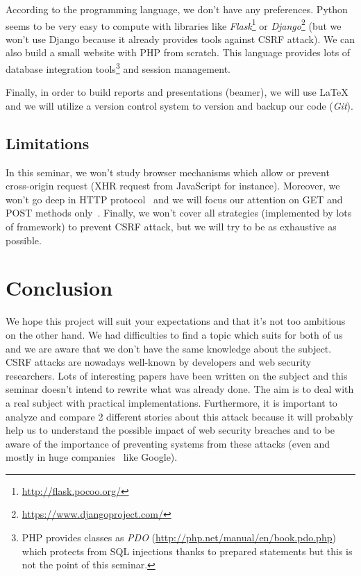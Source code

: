 \documentclass[a4paper,11pt]{article}
\begin{document}
  According to the programming language, we don't have any preferences. Python seems to be very easy to 
  compute with libraries like \textit{Flask}\footnote{\url{http://flask.pocoo.org/}} or 
  \textit{Django}\footnote{\url{https://www.djangoproject.com/}} (but we won't use Django because it 
  already provides tools against CSRF attack). We can also build a small website with PHP from 
  scratch. This language provides lots of database integration tools\footnote{PHP provides classes as \textit{PDO} (\url{http://php.net/manual/en/book.pdo.php}) 
  which protects from SQL injections thanks to prepared statements but this is not the point of this seminar.} 
  and session management.
  
  Finally, in order to build reports and presentations (beamer), we will use \LaTeX{} and we will utilize a version control system to 
  version and backup our code (\textit{Git}).
  
  \subsection{Limitations}

  In this seminar, we won't study browser mechanisms which allow or prevent cross-origin 
  request (XHR request from JavaScript for instance). Moreover, we won't go deep in HTTP 
  protocol~\cite{rfc2616} and we will focus our attention on GET and POST methods 
  only~\cite[5.1.1]{rfc2616}. Finally, we won't cover all strategies (implemented by lots 
  of framework) to prevent CSRF attack, but we will try to be as exhaustive as possible.
  
  \section{Conclusion}
  
  We hope this project will suit your expectations and that it's not too ambitious on the 
  other hand. We had difficulties to find a topic which suits for both of us and we are 
  aware that we don't have the same knowledge about the subject. CSRF attacks are nowadays 
  well-known by developers and web security researchers. Lots of interesting papers have 
  been written on the subject and this seminar doesn't intend to rewrite what was already 
  done. The aim is to deal with a real subject with practical implementations. Furthermore, 
  it is important to analyze and compare 2 different stories about this attack because it 
  will probably help us to understand the possible impact of web security breaches and to be aware  
  of the importance of preventing systems from these attacks (even and mostly in huge companies~\cite{popular_csrf_attacks} 
  like Google).
  
  
  \nocite{wikipedia}
  \nocite{owasp_csrf}
  \nocite{owasp_csrf_presentation}
  


\end{document}
